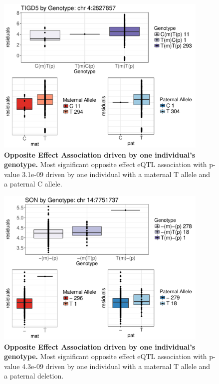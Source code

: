\begin{figure}[!htb]
\centering \includegraphics[width=4in]{img/ch04/fig-01-oeQTL.pdf}
\caption[Opposite Effect Association driven by one individual's genotype.]{\textbf{Opposite Effect Association driven by one individual's genotype.} Most significant opposite effect eQTL association with p-value 3.1e-09 driven by one individual with a maternal T allele and a paternal C allele.}
\label{fig:oeQTL}
\end{figure}

\begin{figure}[!htb]
\centering \includegraphics[width=4in]{img/ch04/fig-02-oeQTL.pdf}
\caption[Opposite Effect Association driven by one individual's genotype.]{\textbf{Opposite Effect Association driven by one individual's genotype.} Most significant opposite effect eQTL association with p-value 4.3e-09 driven by one individual with a maternal T allele and a paternal deletion.}
\label{fig:oeQTL2}
\end{figure}

